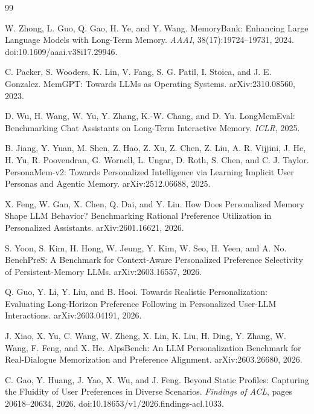 \documentclass[11pt]{article}
\begin{document}
\begin{thebibliography}{99}

W. Zhong, L. Guo, Q. Gao, H. Ye, and Y. Wang.
\newblock MemoryBank: Enhancing Large Language Models with Long-Term Memory.
\newblock \emph{AAAI}, 38(17):19724--19731, 2024.
\newblock doi:10.1609/aaai.v38i17.29946.

C. Packer, S. Wooders, K. Lin, V. Fang, S. G. Patil, I. Stoica, and J. E. Gonzalez.
\newblock MemGPT: Towards LLMs as Operating Systems.
\newblock arXiv:2310.08560, 2023.

D. Wu, H. Wang, W. Yu, Y. Zhang, K.-W. Chang, and D. Yu.
\newblock LongMemEval: Benchmarking Chat Assistants on Long-Term Interactive Memory.
\newblock \emph{ICLR}, 2025.

B. Jiang, Y. Yuan, M. Shen, Z. Hao, Z. Xu, Z. Chen, Z. Liu, A. R. Vijjini, J. He, H. Yu, R. Poovendran, G. Wornell, L. Ungar, D. Roth, S. Chen, and C. J. Taylor.
\newblock PersonaMem-v2: Towards Personalized Intelligence via Learning Implicit User Personas and Agentic Memory.
\newblock arXiv:2512.06688, 2025.

X. Feng, W. Gan, X. Chen, Q. Dai, and Y. Liu.
\newblock How Does Personalized Memory Shape LLM Behavior? Benchmarking Rational Preference Utilization in Personalized Assistants.
\newblock arXiv:2601.16621, 2026.

S. Yoon, S. Kim, H. Hong, W. Jeung, Y. Kim, W. Seo, H. Yeen, and A. No.
\newblock BenchPreS: A Benchmark for Context-Aware Personalized Preference Selectivity of Persistent-Memory LLMs.
\newblock arXiv:2603.16557, 2026.

Q. Guo, Y. Li, Y. Liu, and B. Hooi.
\newblock Towards Realistic Personalization: Evaluating Long-Horizon Preference Following in Personalized User-LLM Interactions.
\newblock arXiv:2603.04191, 2026.

J. Xiao, X. Yu, C. Wang, W. Zheng, X. Lin, K. Liu, H. Ding, Y. Zhang, W. Wang, F. Feng, and X. He.
\newblock AlpsBench: An LLM Personalization Benchmark for Real-Dialogue Memorization and Preference Alignment.
\newblock arXiv:2603.26680, 2026.

C. Gao, Y. Huang, J. Yao, X. Wu, and J. Feng.
\newblock Beyond Static Profiles: Capturing the Fluidity of User Preferences in Diverse Scenarios.
\newblock \emph{Findings of ACL}, pages 20618--20634, 2026.
\newblock doi:10.18653/v1/2026.findings-acl.1033.


\end{thebibliography}
\end{document}
